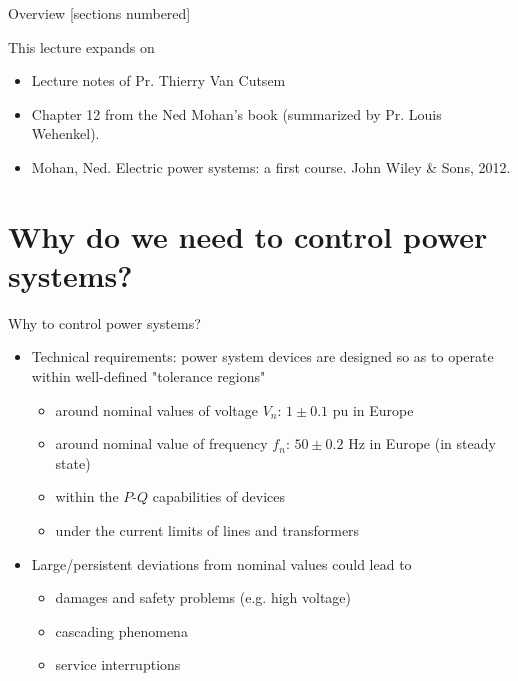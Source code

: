 \titleframe

\begin{frame}{Overview}
  [sections numbered]
  \tableofcontents[hideallsubsections]
\end{frame}





\begin{frame}{This lecture expands on}
    \begin{itemize}
      \item Lecture notes of Pr. Thierry Van Cutsem
      \item Chapter 12 from the Ned Mohan's book (summarized by Pr. Louis Wehenkel).
      \item Mohan, Ned. Electric power systems: a first course. John Wiley \& Sons, 2012.
    \end{itemize}
\end{frame}


\section{Why do we need to control power systems?}

\begin{frame}{Why to control power systems?}
  \begin{itemize}
      \item Technical requirements: power system devices are designed so as to operate within well-defined "tolerance regions" 
      \begin{itemize}
        \item around nominal values of voltage $V_n$: $1 \pm 0.1$ pu in Europe
        \item around nominal value of frequency $f_n$: $50 \pm 0.2$  Hz in Europe (in steady state)
        \item within the $P$-$Q$ capabilities of devices
        \item under the current limits of lines and transformers
      \end{itemize} 
      \item Large/persistent deviations from nominal values could lead to 
      \begin{itemize}
        \item damages and safety problems (e.g. high voltage)
        \item cascading phenomena
        \item service interruptions
      \end{itemize}
      
  \end{itemize}
\end{frame}

